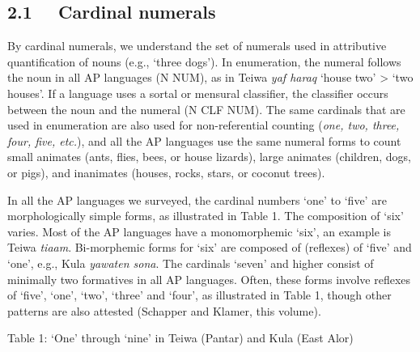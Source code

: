 \subsection[2.1 \ \ Cardinal numerals]{\textup{2.1 \ \ Cardinal numerals}}
\hypertarget{RefHeading105232871885726}{}By cardinal numerals, we understand the set of numerals used in attributive quantification of nouns (e.g., {\textquoteleft}three dogs{\textquoteright}). In enumeration, the numeral follows the noun in all AP languages (N NUM), as in Teiwa \textit{yaf haraq }{\textquoteleft}house two{\textquoteright} {\textgreater} {\textquoteleft}two houses{\textquoteright}. If a language uses a sortal or mensural classifier, the classifier occurs between the noun and the numeral (N CLF NUM). The same cardinals that are used in enumeration are also used for non-referential counting (\textit{one, two, three, four, five, etc.}), and all the AP languages use the same numeral forms to count small animates (ants, flies, bees, or house lizards), large animates (children, dogs, or pigs), and inanimates (houses, rocks, stars, or coconut trees).

In all the AP languages we surveyed, the cardinal numbers {\textquoteleft}one{\textquoteright} to {\textquoteleft}five{\textquoteright} are morphologically simple forms, as illustrated in Table 1. The composition of {\textquoteleft}six{\textquoteright} varies. Most of the AP languages have a monomorphemic {\textquoteleft}six{\textquoteright}, an example is Teiwa \textit{tiaam}. Bi-morphemic forms for {\textquoteleft}six{\textquoteright} are composed of (reflexes) of {\textquoteleft}five{\textquoteright} and {\textquoteleft}one{\textquoteright}, e.g., Kula \textit{yawaten sona}. The cardinals {\textquoteleft}seven{\textquoteright} and higher consist of minimally two formatives in all AP languages. Often, these forms involve reflexes of {\textquoteleft}five{\textquoteright}, {\textquoteleft}one{\textquoteright}, {\textquoteleft}two{\textquoteright}, {\textquoteleft}three{\textquoteright} and {\textquoteleft}four{\textquoteright}, as illustrated in Table 1, though other patterns are also attested (Schapper and 
Klamer, this volume). 

{\centering
Table 1: {\textquoteleft}One{\textquoteright} through {\textquoteleft}nine{\textquoteright} in Teiwa (Pantar) and Kula (East Alor)
\par}

